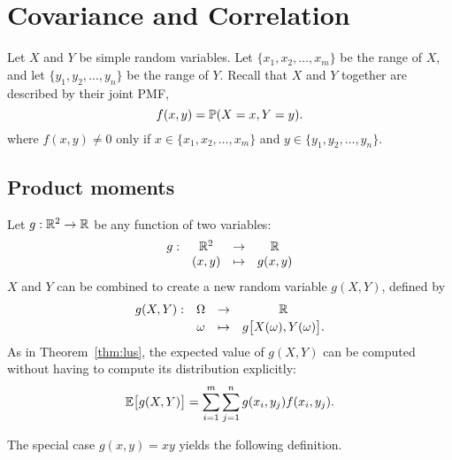 \chapter{Covariance and Correlation}\label{chap:covar}

Let $X$ and $Y$ be simple random variables. Let $\{x_1,x_2,\ldots,x_m\}$ be the range of $X$, and let $\{y_1,y_2,\ldots,y_n\}$ be the range of $Y$.
Recall that $X$ and $Y$ together are described by their joint PMF,
\[
f(x,y) = \mathbb{P}(X=x,Y=y).
\]
where $f(x,y)\neq 0$ only if $x\in\{x_1,x_2,\ldots,x_m\}$ and $y\in\{y_1,y_2,\ldots,y_n\}$.

\section{Product moments}
Let $g:\mathbb{R}^2\to\mathbb{R}$ be any function of two variables:
\[
\begin{array}{cccc}
g:		& \mathbb{R}^2	& \to	& \mathbb{R} \\
		& (x,y)	& \mapsto	& g(x,y)
\end{array}
\]
$X$ and $Y$ can be combined to create a new random variable $g(X,Y)$, defined by
\[
\begin{array}{cccc}
g(X,Y):		& \Omega	& \to		& \mathbb{R} \\[0.5ex]
			& \omega 	& \mapsto	& g\big[X(\omega),Y(\omega)\big].
\end{array}
\]
As in Theorem~\ref{thm:lus}, the expected value of $g(X,Y)$ can be computed without having to compute its distribution explicitly:  
\[
\mathbb{E}\big[g(X,Y)\big] = \sum_{i=1}^m\sum_{j=1}^n g(x_i,y_j)f(x_i,y_j).
\]
%

The special case $g(x,y)=xy$ yields the following definition. %

